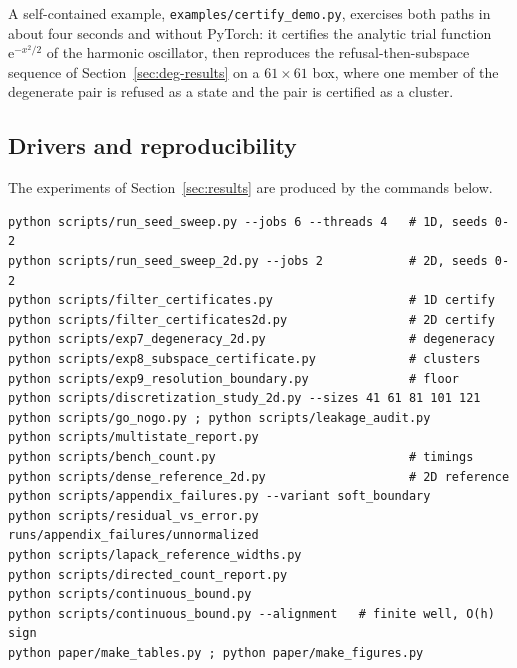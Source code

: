 A self-contained example, \texttt{examples/certify\_demo.py}, exercises both
paths in about four seconds and without PyTorch: it certifies the analytic trial
function $\mathrm{e}^{-x^2/2}$ of the harmonic oscillator, then reproduces the
refusal-then-subspace sequence of Section~\ref{sec:deg-results} on a
$61\times61$ box, where one member of the degenerate pair is refused as a
state and the pair is certified as a cluster.

\subsection{Drivers and reproducibility}

The experiments of Section~\ref{sec:results} are produced by the commands
below.

\noindent\begin{minipage}{\linewidth}
\footnotesize
\begin{verbatim}
python scripts/run_seed_sweep.py --jobs 6 --threads 4   # 1D, seeds 0-2
python scripts/run_seed_sweep_2d.py --jobs 2            # 2D, seeds 0-2
python scripts/filter_certificates.py                   # 1D certify
python scripts/filter_certificates2d.py                 # 2D certify
python scripts/exp7_degeneracy_2d.py                    # degeneracy
python scripts/exp8_subspace_certificate.py             # clusters
python scripts/exp9_resolution_boundary.py              # floor
python scripts/discretization_study_2d.py --sizes 41 61 81 101 121
python scripts/go_nogo.py ; python scripts/leakage_audit.py
python scripts/multistate_report.py
python scripts/bench_count.py                           # timings
python scripts/dense_reference_2d.py                    # 2D reference
python scripts/appendix_failures.py --variant soft_boundary
python scripts/residual_vs_error.py runs/appendix_failures/unnormalized
python scripts/lapack_reference_widths.py
python scripts/directed_count_report.py
python scripts/continuous_bound.py
python scripts/continuous_bound.py --alignment   # finite well, O(h) sign
python paper/make_tables.py ; python paper/make_figures.py
\end{verbatim}
\end{minipage}


